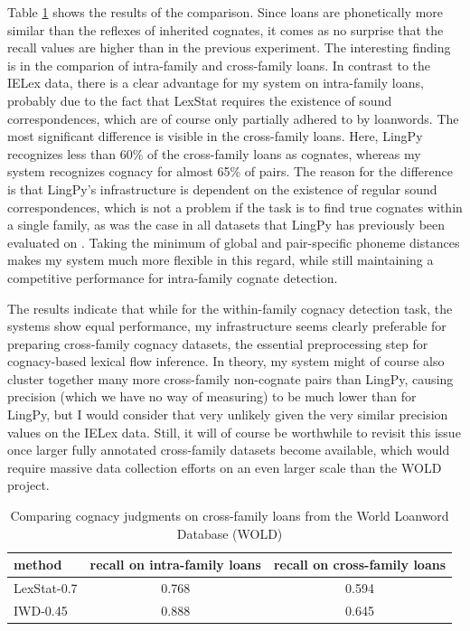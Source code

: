 Table \ref{lingpyComparisonWOLD} shows the results of the comparison. Since loans are phonetically more similar than the reflexes of inherited cognates, it comes as no surprise that the recall values are higher than in the previous experiment. The interesting finding is in the comparion of intra-family and cross-family loans. In contrast to the IELex data, there is a clear advantage for my system on intra-family loans, probably due to the fact that LexStat requires the existence of sound correspondences, which are of course only partially adhered to by loanwords. The most significant difference is visible in the cross-family loans. Here, LingPy recognizes less than 60\% of the cross-family loans as cognates, whereas my system recognizes cognacy for almost 65\% of pairs. The reason for the difference is that LingPy's infrastructure is dependent on the existence of regular sound correspondences, which is not a problem if the task is to find true cognates within a single family, as was the case in all datasets 
that LingPy has previously been evaluated on \citep{list_ea_2017}. Taking the minimum of global and pair-specific phoneme distances makes my system much more flexible in this regard, while still maintaining a competitive performance for intra-family cognate detection. 

The results indicate that while for the within-family cognacy detection task, the systems show equal performance, my infrastructure seems clearly preferable for preparing cross-family cognacy datasets, the essential preprocessing step for cognacy-based lexical flow inference. In theory, my system might of course also cluster together many more cross-family non-cognate pairs than LingPy, causing precision (which we have no way of measuring) to be much lower than for LingPy, but I would consider that very unlikely given the very similar precision values on the IELex data. Still, it will of course be worthwhile to revisit this issue once larger fully annotated cross-family datasets become available, which would require massive data collection efforts on an even larger scale than the WOLD project.

\begin{table}
 \centering
\begin{tabular}{lcc}
  \hline \hline
  method & recall on intra-family loans & recall on cross-family loans\\ \hline
  LexStat-0.7 & 0.768 & 0.594\\
  IWD-0.45 & 0.888 & 0.645\\
  \hline
 \end{tabular}
 \caption{Comparing cognacy judgments on cross-family loans from the World Loanword Database (WOLD)}
 \label{lingpyComparisonWOLD}
\end{table}

